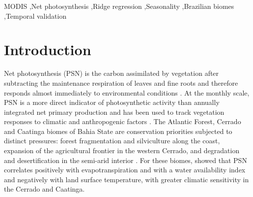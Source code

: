 \documentclass[a4paper,fleqn]{cas-dc}
\begin{document}
\begin{keywords}
MODIS \sep Net photosynthesis \sep Ridge regression \sep Seasonality \sep Brazilian biomes \sep Temporal validation
\end{keywords}

\maketitle

\section{Introduction}\label{sec:intro}

Net photosynthesis (PSN) is the carbon assimilated by vegetation after subtracting the maintenance respiration of leaves and fine roots and therefore responds almost immediately to environmental conditions \citep{running2004,running2021gpp}. At the monthly scale, PSN is a more direct indicator of photosynthetic activity than annually integrated net primary production and has been used to track vegetation responses to climatic and anthropogenic factors \citep{nemani2003,benfica2023}. The Atlantic Forest, Cerrado and Caatinga biomes of Bahia State are conservation priorities subjected to distinct pressures: forest fragmentation and silviculture along the coast, expansion of the agricultural frontier in the western Cerrado, and degradation and desertification in the semi-arid interior \citep{ribeiro2009,lima2020,marengo2018,mapbiomas2025}. For these biomes, \citet{benfica2022,benfica2023} showed that PSN correlates positively with evapotranspiration and with a water availability index and negatively with land surface temperature, with greater climatic sensitivity in the Cerrado and Caatinga.
\end{document}
